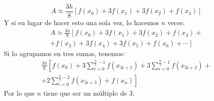 \documentclass[10pt]{article}
\begin{document}
\begin{multicols}{2}
		$$A\approx {\frac {3h}{8}}\left[f(x_0)+3f\left({x_1}\right)+3f\left({x_2}\right)+f(x_3)\right]$$
		Y si en lugar de hacer esto una sola vez, lo hacemos $n$ veces:
		\begin{equation*}
			\begin{split}
				A\approx \frac{3h}{8}\left[f(x_0)+3f(x_1)+3f(x_2)+f(x_3)+\right.\\
				\left. +f(x_3)+3f(x_4)+3f(x_5)+f(x_6)+\cdots \right]
			\end{split}
		\end{equation*}
		Si lo agrupamos en tres sumas, tenemos:
		\begin{equation*}
			\begin{split}
				\frac{3h}{8} \left[f(x_0) + 3\sum_{i=0}^{\frac{n}{3}-1}f(x_{3i+1}) +3\sum_{i=0}^{\frac{n}{3}-1}f(x_{3i+2})+\right. \\
				\left.+2\sum_{i=0}^{\frac{n}{3}-2}f(x_{3i+3}) + f(x_n)\right] 
			\end{split}
		\end{equation*}
		Por lo que $n$ tiene que ser un múltiplo de 3.

\end{multicols}
\end{document}
